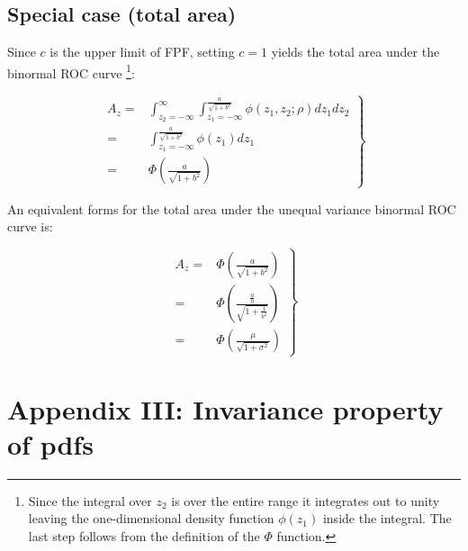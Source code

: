 \documentclass[
]{book}
\begin{document}
\hypertarget{binormal-model-appendix-1-total-auc}{%
\subsection{Special case (total area)}\label{binormal-model-appendix-1-total-auc}}

Since \(c\) is the upper limit of FPF, setting \(c = 1\) yields the total area under the binormal ROC curve \footnote{Since the integral over \(z_2\) is over the entire range it integrates out to unity leaving the one-dimensional density function \(\phi\left ( z_1 \right )\) inside the integral. The last step follows from the definition of the \(\Phi\) function.}:

\begin{equation}
\left. 
\begin{aligned}
A_{z} = & \int_{z_2=-\infty}^{\infty}   \int_{z_1=-\infty}^{\frac{a}{\sqrt{1+b^2}}} \phi\left ( z_1,z_2;\rho \right ) dz_1dz_2 \\
= &  \int_{z_1=-\infty}^{\frac{a}{\sqrt{1+b^2}}} \phi\left ( z_1 \right ) dz_1 \\
= & \Phi\left ( \frac{a}{\sqrt{1+b^2}} \right )
\end{aligned}
\right \}
\label{eq:binormal-model-partial-area-special-case}
\end{equation}

An equivalent forms for the total area under the unequal variance binormal ROC curve is:

\begin{equation}
\left. 
\begin{aligned}
A_{z} =  & \Phi\left ( \frac{a}{\sqrt{1+b^2}} \right ) \\
= & \Phi\left ( \frac{\frac{a}{b}}{\sqrt{1+\frac{1}{b^2}}} \right ) \\
= & \Phi\left ( \frac{\mu}{\sqrt{1 + \sigma^2}} \right )
\end{aligned}
\right \}
\label{eq:binormal-model-partial-area-special-case-2}
\end{equation}

\hypertarget{binormal-model-invariance-property-appendix-3}{%
\section{Appendix III: Invariance property of pdfs}\label{binormal-model-invariance-property-appendix-3}}
\end{document}
